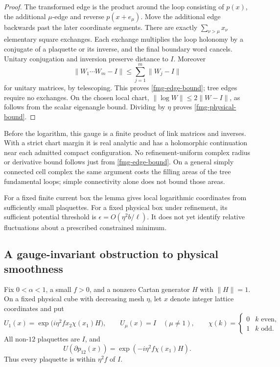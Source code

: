 \begin{proof}
The transformed edge is the product around the loop consisting
of \(p(x)\), the additional \(\mu\)-edge and reverse \(p(x+e_\mu)\).
Move the additional edge backwards past the later coordinate
segments. There are exactly \(\sum_{\nu>\mu}x_\nu\) elementary
square exchanges. Each exchange multiplies the loop holonomy
by a conjugate of a plaquette or its inverse, and the final
boundary word cancels. Unitary conjugation and inversion
preserve distance to \(I\). Moreover
\[
       \|W_1\cdots W_m-I\|
                     \le\sum_{j=1}^m\|W_j-I\|
\]
for unitary matrices, by telescoping. This proves
\eqref{fmg-edge-bound}; tree edges require no exchanges.
On the chosen local chart,
\(\|\log W\|\le2\|W-I\|\), as follows from the scalar eigenangle
bound. Dividing by \(\eta\) proves \eqref{fmg-physical-bound}.
\end{proof}

Before the logarithm, this gauge is a finite product of link
matrices and inverses. With a strict chart margin it is real
analytic and has a holomorphic continuation near each admitted
compact configuration. No refinement-uniform complex radius
or derivative bound follows just from
\eqref{fmg-edge-bound}. On a general simply connected cell complex
the same argument costs the filling areas of the tree fundamental
loops; simple connectivity alone does not bound those areas.

For a fixed finite current box the lemma gives local logarithmic
coordinates from sufficiently small plaquettes. For a fixed
physical box under refinement, its sufficient potential threshold
is \(\epsilon=O(\eta^2 b/\ell)\). It does not yet identify relative
fluctuations about a prescribed constrained minimum.

\subsection{A gauge-invariant obstruction to physical smoothness}
\label{fmg-holder-obstruction}

Fix \(0<\alpha<1\), a small \(f>0\), and a nonzero Cartan
generator \(H\) with \(\|H\|=1\). On a fixed physical cube
with decreasing mesh \(\eta\), let \(x\) denote integer lattice
coordinates and put
\begin{equation}
 U_1(x)=\exp\!\bigl(i\eta^2 f x_2\chi(x_1)H\bigr),\qquad
 U_\mu(x)=I\quad(\mu\ne1),
 \qquad
 \chi(k)=\begin{cases}0&k\text{ even},\\1&k\text{ odd}.
                     \end{cases}
 \label{fmg-oscillating-field}
\end{equation}
All non-\(12\) plaquettes are \(I\), and
\begin{equation}
               U(\partial p_{12}(x))
                    =\exp(-i\eta^2 f\chi(x_1)H).
 \label{fmg-oscillating-curvature}
\end{equation}
Thus every plaquette is within \(\eta^2f\) of \(I\).

